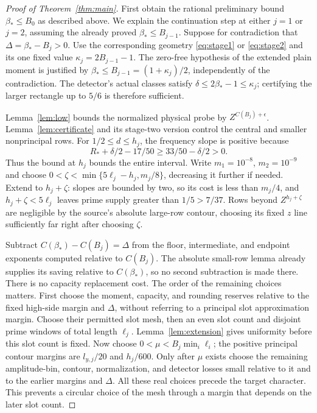 \documentclass[11pt]{article}
\newcommand{\Bstar}{\beta_*}
\begin{document}
\begin{proof}[Proof of Theorem~\ref{thm:main}]
First obtain the rational preliminary bound $\Bstar\le B_0$ as described
above. We explain the continuation step at either $j=1$ or $j=2$,
assuming the already proved $\Bstar\le B_{j-1}$. Suppose for
contradiction that $\Delta=\Bstar-B_j>0$.
Use the corresponding geometry \eqref{eq:stage1} or \eqref{eq:stage2}
and its one fixed value $\kappa_j=2B_{j-1}-1$.
The zero-free hypothesis of the extended plain moment is justified by
$\Bstar\le B_{j-1}=(1+\kappa_j)/2$, independently of the contradiction.
The detector's actual classes satisfy $\delta\le2\Bstar-1\le\kappa_j$;
certifying the larger rectangle up to $5/6$ is therefore sufficient.

Lemma~\ref{lem:low} bounds the normalized physical probe by
$Z^{C(B_j)+\epsilon}$. Lemma~\ref{lem:certificate} and its stage-two
version control the central and smaller nonprincipal rows.
For $1/2\le d\le h_j$, the frequency
slope is positive because
\[
 R_*+\delta/2-17/50\ge33/50-\delta/2>0.
\]
Thus the bound at $h_j$ bounds the entire interval. Write $m_1=10^{-8}$,
$m_2=10^{-9}$ and choose
$0<\zeta<\min\{5\ell_j-h_j,m_j/8\}$, decreasing it further if needed.
Extend to $h_j+\zeta$: slopes are bounded by two, so its cost is less
than $m_j/4$, and $h_j+\zeta<5\ell_j$ leaves prime supply greater
than $1/5>7/37$. Rows beyond $Z^{h_j+\zeta}$
are negligible by the source's absolute large-row contour, choosing its
fixed $z$ line sufficiently far right after choosing $\zeta$.

Subtract $C(\Bstar)-C(B_j)=\Delta$ from the floor, intermediate, and
endpoint exponents computed relative to $C(B_j)$. The absolute small-row
lemma already supplies its saving relative to $C(\Bstar)$, so no second
subtraction is made there. There is no capacity replacement cost.
The order of the remaining choices matters.
First choose the moment, capacity, and rounding reserves relative to the
fixed high-side margin and $\Delta$, without referring to a principal
slot approximation margin. Choose their permitted slot mesh, then an even
slot count and disjoint prime windows of total length $\ell_j$.
Lemma~\ref{lem:extension} gives uniformity before this slot count is fixed.
Now choose $0<\mu<B_j\min_i\ell_i$; the positive principal contour
margins are $l_{y,j}/20$ and $h_j/600$. Only after $\mu$ exists choose
the remaining amplitude-bin, contour, normalization, and detector losses
small relative to it and to the earlier margins and $\Delta$. All these
real choices precede the target character. This prevents a circular
choice of the mesh through a margin that depends on the later slot count.


\end{proof}
\end{document}
